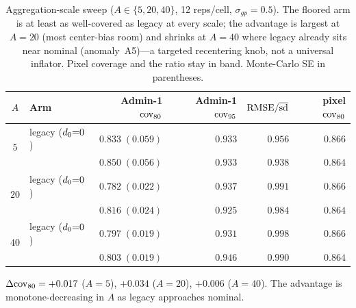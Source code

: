 \begin{table}[t]
\centering
\small
\caption{Aggregation-scale sweep ($A\in\{5,20,40\}$, 12 reps/cell, $\sigma_{gp}=0.5$).
The floored arm is at least as well-covered as legacy at every scale; the advantage
is largest at $A=20$ (most center-bias room) and shrinks at $A=40$ where legacy
already sits near nominal (anomaly~A5)---a targeted recentering knob, not a universal
inflator. Pixel coverage and the ratio stay in band. Monte-Carlo SE in parentheses.}
\label{tab:scale}
\begin{tabular}{c l rr r r}
\toprule
$A$ & Arm & Admin-1 $\mathrm{cov}_{80}$ & Admin-1 $\mathrm{cov}_{95}$ & $\mathrm{RMSE}/\overline{\mathrm{sd}}$ & pixel $\mathrm{cov}_{80}$ \\
\midrule
\multirow{2}{*}{$5$}  & legacy ($d_0{=}0$) & $0.833\;(0.059)$ & $0.933$ & $0.956$ & $0.866$ \\
                      & \bartsimpsd{}      & $0.850\;(0.056)$ & $0.933$ & $0.938$ & $0.864$ \\
\midrule
\multirow{2}{*}{$20$} & legacy ($d_0{=}0$) & $0.782\;(0.022)$ & $0.937$ & $0.991$ & $0.866$ \\
                      & \bartsimpsd{}      & $0.816\;(0.024)$ & $0.925$ & $0.984$ & $0.864$ \\
\midrule
\multirow{2}{*}{$40$} & legacy ($d_0{=}0$) & $0.797\;(0.019)$ & $0.931$ & $0.998$ & $0.866$ \\
                      & \bartsimpsd{}      & $0.803\;(0.019)$ & $0.946$ & $0.990$ & $0.864$ \\
\bottomrule
\end{tabular}

\vspace{2pt}
{\footnotesize $\Delta\mathrm{cov}_{80}=+0.017$ ($A{=}5$), $+0.034$ ($A{=}20$), $+0.006$
($A{=}40$). The advantage is monotone-decreasing in $A$ as legacy approaches nominal.}
\end{table}
